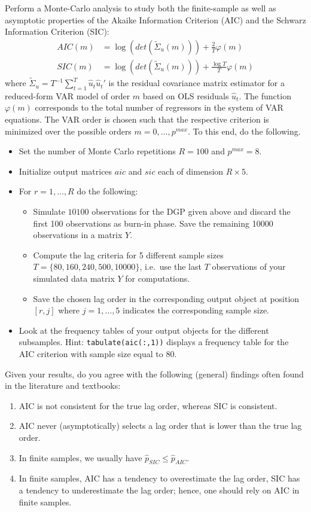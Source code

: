 \documentclass{article}
\begin{document}
Perform a Monte-Carlo analysis to study both the finite-sample as well as asymptotic properties
  of the Akaike Information Criterion (AIC) and the Schwarz Information Criterion (SIC):
\begin{align*}
AIC(m)  &= \log(det(\tilde{\Sigma}_u(m))) + \frac{2}{T}\varphi(m)\\
SIC(m)  &= \log(det(\tilde{\Sigma}_u(m))) + \frac{\log T}{T}\varphi(m)
\end{align*}
where \(\tilde{\Sigma}_u=T^{-1}\sum_{t=1}^T \hat{u}_t\hat{u}_t'\) is the residual covariance matrix estimator
  for a reduced-form VAR model of order $m$ based on OLS residuals \(\hat{u}_t\).
The function \(\varphi(m)\) corresponds to the total number of regressors in the system of VAR equations.
The VAR order is chosen such that the respective criterion is minimized over the possible orders \(m = 0,\ldots,p^{max}\).
To this end, do the following.

\begin{itemize}
\item Set the number of Monte Carlo repetitions \(R=100\) and \(p^{max}=8\).
\item Initialize output matrices \(aic\) and \(sic\) each of dimension \(R \times 5\).
\item For \(r=1,\ldots,R\) do the following:
\begin{itemize}
  \item Simulate \(10100\) observations for the DGP given above and discard the first 100 observations as burn-in phase.
  Save the remaining 10000 observations in a matrix \(Y\).
  \item Compute the lag criteria for 5 different sample sizes \(T=\{80, 160, 240, 500, 10000\} \),
  i.e.\ use the last \(T\) observations of your simulated data matrix \(Y\) for computations.
  \item Save the chosen lag order in the corresponding output object at position \([r,j]\) where \(j=1,\ldots,5\) indicates the corresponding sample size.
\end{itemize}
\item Look at the frequency tables of your output objects for the different subsamples.
Hint: \texttt{tabulate(aic(:,1))} displays a frequency table for the AIC criterion with sample size equal to 80.
\end{itemize}
Given your results, do you agree with the following (general) findings often found in the literature and textbooks:
\begin{enumerate}
\item AIC is not consistent for the true lag order, whereas SIC is consistent.
\item AIC never (asymptotically) selects a lag order that is lower than the true lag order.
\item In finite samples, we usually have \(\hat{p}_{SIC} \leq \hat{p}_{AIC}\).
\item In finite samples, AIC has a tendency to overestimate the lag order, SIC has a tendency to underestimate the lag order; hence, one should rely on AIC in finite samples.
\end{enumerate}
\end{document}
